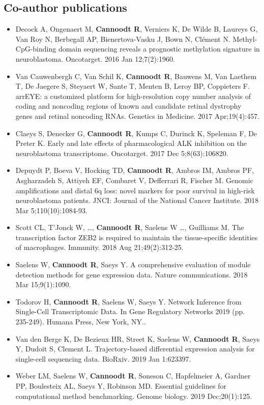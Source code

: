 \subsection{Co-author publications}
\begin{itemize}
	\item Decock A, Ongenaert M, \textbf{Cannoodt R}, Verniers K, De Wilde B, Laureys G, Van Roy N, Berbegall AP, Bienertova-Vasku J, Bown N, Clément N. Methyl-CpG-binding domain sequencing reveals a prognostic methylation signature in neuroblastoma. Oncotarget. 2016 Jan 12;7(2):1960.
	\item Van Cauwenbergh C, Van Schil K, \textbf{Cannoodt R}, Bauwens M, Van Laethem T, De Jaegere S, Steyaert W, Sante T, Menten B, Leroy BP, Coppieters F. arrEYE: a customized platform for high-resolution copy number analysis of coding and noncoding regions of known and candidate retinal dystrophy genes and retinal noncoding RNAs. Genetics in Medicine. 2017 Apr;19(4):457.
	\item Claeys S, Denecker G, \textbf{Cannoodt R}, Kumps C, Durinck K, Speleman F, De Preter K. Early and late effects of pharmacological ALK inhibition on the neuroblastoma transcriptome. Oncotarget. 2017 Dec 5;8(63):106820.
	\item Depuydt P, Boeva V, Hocking TD, \textbf{Cannoodt R}, Ambros IM, Ambros PF, Asgharzadeh S, Attiyeh EF, Combaret V, Defferrari R, Fischer M. Genomic amplifications and distal 6q loss: novel markers for poor survival in high-risk neuroblastoma patients. JNCI: Journal of the National Cancer Institute. 2018 Mar 5;110(10):1084-93.
	\item Scott CL, T'Jonck W, \ldots, \textbf{Cannoodt R}, Saelens W \ldots, Guilliams M. The transcription factor ZEB2 is required to maintain the tissue-specific identities of macrophages. Immunity. 2018 Aug 21;49(2):312-25.
	\item Saelens W, \textbf{Cannoodt R}, Saeys Y. A comprehensive evaluation of module detection methods for gene expression data. Nature communications. 2018 Mar 15;9(1):1090.
	\item Todorov H, \textbf{Cannoodt R}, Saelens W, Saeys Y. Network Inference from Single-Cell Transcriptomic Data. In Gene Regulatory Networks 2019 (pp. 235-249). Humana Press, New York, NY..
	\item Van den Berge K, De Bezieux HR, Street K, Saelens W, \textbf{Cannoodt R}, Saeys Y, Dudoit S, Clement L. Trajectory-based differential expression analysis for single-cell sequencing data. BioRxiv. 2019 Jan 1:623397.
	\item Weber LM, Saelens W, \textbf{Cannoodt R}, Soneson C, Hapfelmeier A, Gardner PP, Boulesteix AL, Saeys Y, Robinson MD. Essential guidelines for computational method benchmarking. Genome biology. 2019 Dec;20(1):125.
\end{itemize}

